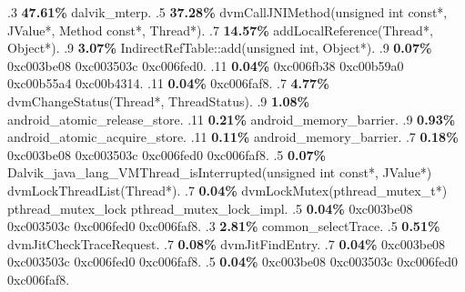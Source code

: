 \begin{profile}
{.3 \textbf{47.61\%} dalvik\_mterp. 
.5 \textbf{37.28\%} dvmCallJNIMethod(unsigned int const*, JValue*, Method const*, Thread*). 
.7 \textbf{14.57\%} addLocalReference(Thread*, Object*). 
.9 \textbf{3.07\%} IndirectRefTable::add(unsigned int, Object*). 
.9 \textbf{0.07\%} 0xc003be08\newline {} 0xc003503c\newline {} 0xc006fed0. 
.11 \textbf{0.04\%} 0xc006fb38\newline {} 0xc00b59a0\newline {} 0xc00b55a4\newline {} 0xc00b4314. 
.11 \textbf{0.04\%} 0xc006faf8. 
.7 \textbf{4.77\%} dvmChangeStatus(Thread*, ThreadStatus). 
.9 \textbf{1.08\%} android\_atomic\_release\_store. 
.11 \textbf{0.21\%} android\_memory\_barrier. 
.9 \textbf{0.93\%} android\_atomic\_acquire\_store. 
.11 \textbf{0.11\%} android\_memory\_barrier. 
.7 \textbf{0.18\%} 0xc003be08\newline {} 0xc003503c\newline {} 0xc006fed0\newline {} 0xc006faf8. 
.5 \textbf{0.07\%} Dalvik\_java\_lang\_VMThread\_isInterrupted(unsigned int const*, JValue*)\newline {} dvmLockThreadList(Thread*). 
.7 \textbf{0.04\%} dvmLockMutex(pthread\_mutex\_t*)\newline {} pthread\_mutex\_lock\newline {} pthread\_mutex\_lock\_impl. 
.5 \textbf{0.04\%} 0xc003be08\newline {} 0xc003503c\newline {} 0xc006fed0\newline {} 0xc006faf8. 
.3 \textbf{2.81\%} common\_selectTrace. 
.5 \textbf{0.51\%} dvmJitCheckTraceRequest. 
.7 \textbf{0.08\%} dvmJitFindEntry. 
.7 \textbf{0.04\%} 0xc003be08\newline {} 0xc003503c\newline {} 0xc006fed0\newline {} 0xc006faf8. 
.5 \textbf{0.04\%} 0xc003be08\newline {} 0xc003503c\newline {} 0xc006fed0\newline {} 0xc006faf8. 
}
\end{profile}
